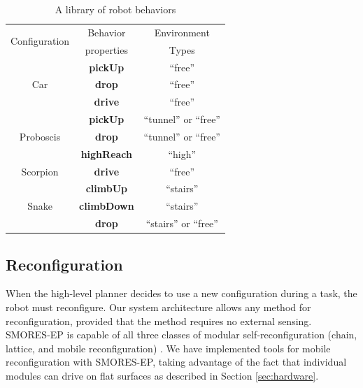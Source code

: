\documentclass[journal]{IEEEtran}
\begin{document}
%
\begin{table}
\centering
\begin{tabular}{ |c|c|c| } 
 \hline
 \multirow{2}{6em}{Configuration} & Behavior & Environment \\
 & properties & Types \\
 \hline
 \multirow{3}{*}{Car} & \textbf{pickUp} & ``free'' \\\cline{2-3}
  & \textbf{drop} & ``free'' \\\cline{2-3}
  & \textbf{drive} & ``free''\\ \hline
 \multirow{3}{*}{Proboscis} & \textbf{pickUp} & ``tunnel'' or ``free''\\ \cline{2-3}
  & \textbf{drop} &``tunnel'' or ``free'' \\ \cline{2-3}
  & \textbf{highReach} & ``high''\\ \hline
 Scorpion & \textbf{drive} & ``free''\\ \hline
 \multirow{3}{*}{Snake} & \textbf{climbUp} & ``stairs''\\ \cline{2-3}
  & \textbf{climbDown} & ``stairs''\\ \cline{2-3}
  & \textbf{drop} & ``stairs'' or ``free''\\
 \hline
\end{tabular}
\caption{A library of robot behaviors}
\label{table:1}
\vspace{-2em}
\end{table}

\subsection{Reconfiguration}
\label{sec:reconfiguration}
%
When the high-level planner decides to use a new configuration during a task, the robot must reconfigure. Our system architecture allows any method for reconfiguration, provided that the method requires no external sensing. SMORES-EP is capable of all three classes of modular self-reconfiguration (chain, lattice, and mobile reconfiguration) \cite{Davey2012,yim2003modular}.  We have implemented tools for mobile reconfiguration with SMORES-EP, taking advantage of the fact that individual modules can drive on flat surfaces as described in Section \ref{sec:hardware}.
\end{document}
